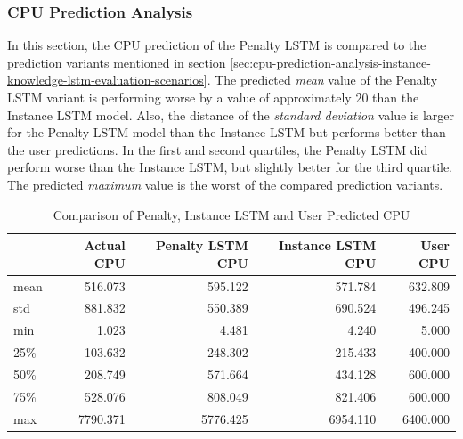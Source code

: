     \subsubsection{CPU Prediction Analysis}
    \label{sec:cpu-prediction-analysis-pmse-lstm-evaluation}

      In this section, the CPU prediction of the Penalty LSTM is compared to the prediction variants mentioned in section \ref{sec:cpu-prediction-analysis-instance-knowledge-lstm-evaluation-scenarios}.
      The predicted \emph{mean} value of the Penalty LSTM variant is performing worse by a value of approximately $20$ than the Instance LSTM model.
      Also, the distance of the \emph{standard deviation} value is larger for the Penalty LSTM model than the Instance LSTM but performs better than the user predictions.
      In the first and second quartiles, the Penalty LSTM did perform worse than the Instance LSTM, but slightly better for the third quartile.
      The predicted \emph{maximum} value is the worst of the compared prediction variants.
      

      \begin{table}
        \centering
        \caption{Comparison of Penalty, Instance LSTM and User Predicted CPU}
        \label{tab:comparison-pmse-lstm-user-predicted-cpu}

        \begin{tabular}{|l|rrrr|}
          \toprule
          {} &  Actual CPU &  Penalty LSTM CPU &  Instance LSTM CPU &  User CPU \\
          \midrule
          mean &     516.073 &        595.122 &            571.784 &   632.809 \\
          std  &     881.832 &        550.389 &            690.524 &   496.245 \\
          min  &       1.023 &          4.481 &              4.240 &     5.000 \\
          25\%  &     103.632 &        248.302 &            215.433 &   400.000 \\
          50\%  &     208.749 &        571.664 &            434.128 &   600.000 \\
          75\%  &     528.076 &        808.049 &            821.406 &   600.000 \\
          max  &    7790.371 &       5776.425 &           6954.110 &  6400.000 \\
          \bottomrule
          \end{tabular}
      \end{table}

